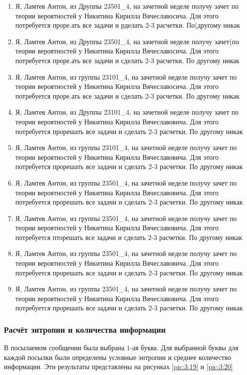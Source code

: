 \begin{itemize}
\begin{enumerate}
		\item
		Я, Ламтев Антон, из Друппы 23501\_4, на зачетной неделе получу зачет по теории вероятностей у Никитина Кирилла Вячеславосича. Для этого потребуется проре.ать все задачи и рделать 2-3 расчетки. По(другому никак
		\item
		Я, Ламтев Антон, из Друппы 23501\_4, на зачетной неделе получу зачет(по теории вероятностей у Никитина Кирилла Вячеславосича. Для этого потребуется проре.ать все задачи и сделать 2-3 расчетки. По другому никак
		\item
		Я, Ламтев Антон, из группы 23101\_4, на зачетной неделе получу зачет по теории вероятностей у Никитина Кирилла Вячеславосича. Для этого потребуется проре.ать все задачи и сделать 2-3 расчетки. По другому никак
		\item
		Я, Ламтев Антон, из Друппы 23101\_4, на зачетной неделе получу зачет по теории вероятностей у Никитина Кирилла Вячеславовича. Для этого потребуется прорешать все задачи и сделать 2-3 расчетки. По другому никак
		\item
		Я, Ламтев Антон, из группы 23101\_4, на зачетной неделе получу зачет по теории вероятностей у Никитина Кирилла Вячеславовича. Для этого потребуется прорешать все задачи и сделать 2-3 расчетки. По другому никак
		\item
		Я, Ламтев Антон, из группы 23501\_4, на зачетной неделе получу зачет по теории вероятностей у Никитина Кирилла Вячеславовича. Для этого потребуется прорешать все задачи и сделать 2-3 расчетки. По другому никак
		\item
		Я, Ламтев Антон, из группы 23501\_4, на зачетной неделе получу зачет по теории вероятностей у Никитина Кирилла Вячеславовича. Для этого потребуется пторешать все задачи и сделать 2-3 расчетки. По другому никак
		\item
		Я, Ламтев Антон, из группы 23501\_4, на зачетной неделе получу зачет по теории вероятностей у Никитина Кирилла Вячеславовича. Для этого потребуется прорешать все задачи и сделать 2-3 расчетки. По другому никак
		\item
		Я, Ламтев Антон, из группы 23501\_4, на зачетной неделе получу зачет по теории вероятностей у Никитина Кирилла Вячеславовича. Для этого потребуется прорешать все задачи и сделать 2-3 расчетки. По другому никак

	\end{enumerate}
		
\end{itemize}

\subsubsection{Расчёт энтропии и количества информации}
\label{sect:3:1:2}
В посылаемом сообщении была выбрана $1$-ая буква. Для выбранной буквы для каждой посылки были определены условные энтропии и среднее количество информации. Эти результаты представлены на рисунках \ref{pic:3:19} и \ref{pic:3:20}


